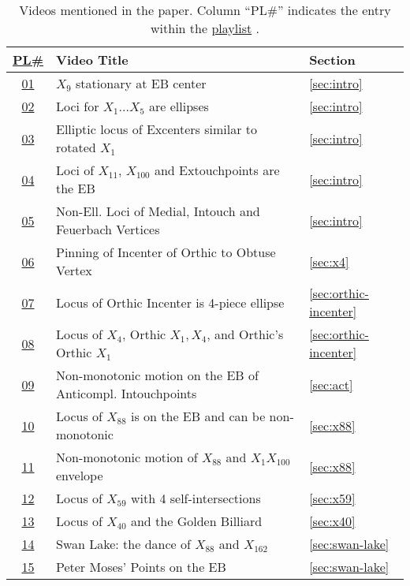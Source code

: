 \begin{table}
\begin{center}
\small
\begin{tabular}{|c|l|l|}
\hline
\href{https://bit.ly/2vvJ9hW}{PL\#} & Video Title & Section\\
\hline
\href{https://youtu.be/tMrBqfRBYik}{01} &
{$X_9$ stationary at EB center} & \ref{sec:intro} \\
\href{https://youtu.be/sMcNzcYaqtg}{02} &
{Loci for $X_1\ldots{X_5}$ are ellipses} &
\ref{sec:intro} \\
\href{https://youtu.be/Xxr1DUo19_w}{03} &
{Elliptic locus of Excenters similar to rotated $X_1$} &
\ref{sec:intro} \\
\href{https://youtu.be/TXdg7tUl8lc}{04} &
{Loci of $X_{11}$, $X_{100}$ and Extouchpoints are the EB} &\ref{sec:intro} \\

\href{https://youtu.be/OGvCQbYqJyI}{05} &
{Non-Ell. Loci of Medial, Intouch and Feuerbach Vertices} & \ref{sec:intro} \\

\href{https://youtu.be/-bLuvICzmqM}{06} &
{Pinning of Incenter of Orthic to Obtuse Vertex} & \ref{sec:x4} \\

\href{https://youtu.be/3qJnwpFkUFQ}{07} &
{Locus of Orthic Incenter is 4-piece ellipse} &
\ref{sec:orthic-incenter} \\

\href{https://youtu.be/HY577AZVi7I}{08} &
Locus of $X_4$, Orthic $X_1,X_4$, and Orthic's Orthic $X_1$ &
\ref{sec:orthic-incenter} \\

\href{https://youtu.be/50dyxWJhfN4}{09} &
{Non-monotonic motion on the EB of Anticompl. Intouchpoints} &
\ref{sec:act} \\
\href{https://youtu.be/DaoNJRcf-0E}{10} &
{Locus of $X_{88}$ is on the EB and can be non-monotonic} &
\ref{sec:x88} \\
\href{https://youtu.be/nJLp--JjDZU}{11} &
{Non-monotonic motion of $X_{88}$ and $X_1X_{100}$ envelope} &
\ref{sec:x88} \\
\href{https://youtu.be/pl_PqSuhlx0}{12} &
{Locus of $X_{59}$ with 4 self-intersections} &
\ref{sec:x59} \\
\href{https://youtu.be/rg28gGr-Qeo}{13} &
{Locus of $X_{40}$ and the Golden Billiard} & \ref{sec:x40}\\
\href{https://youtu.be/ljGTtA1x-Sk}{14} &
{Swan Lake: the dance of $X_{88}$ and $X_{162}$} &
\ref{sec:swan-lake}  \\
\href{https://youtu.be/JdcJt5PExsw}{15} &
{Peter Moses' Points on the EB} &
\ref{sec:swan-lake} \\
\hline
\end{tabular}
\caption{Videos mentioned in the paper. Column ``PL\#'' indicates the entry within the \href{https://bit.ly/2vvJ9hW}{playlist} \cite{reznik2020-playlist-intriguing}.}
\label{tab:playlist}
\end{center}
\end{table}




 



